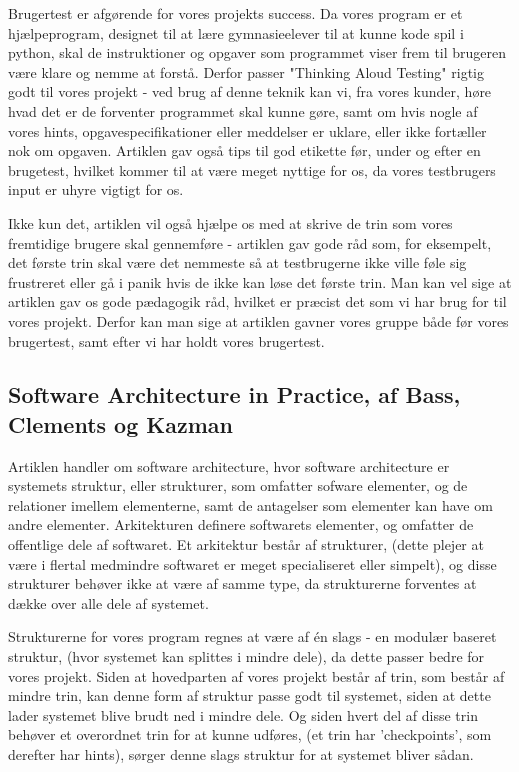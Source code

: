 \documentclass[10pt,a4paper,danish]{article}
\begin{document}
Brugertest er afgørende for vores projekts success. Da vores program er et hjælpeprogram, designet til at lære gymnasieelever til at kunne kode spil i python, skal de instruktioner og opgaver som programmet viser frem til brugeren være klare og nemme at forstå. Derfor passer "Thinking Aloud Testing" rigtig godt til vores projekt - ved brug af denne teknik kan vi, fra vores kunder, høre hvad det er de forventer programmet skal kunne gøre, samt om hvis nogle af vores hints, opgavespecifikationer eller meddelser er uklare, eller ikke fortæller nok om opgaven. Artiklen gav også tips til god etikette før, under og efter en brugetest, hvilket kommer til at være meget nyttige for os, da vores testbrugers input er uhyre vigtigt for os.

Ikke kun det, artiklen vil også hjælpe os med at skrive de trin som vores fremtidige brugere skal gennemføre - artiklen gav gode råd som, for eksempelt, det første trin skal være det nemmeste så at testbrugerne ikke ville føle sig frustreret eller gå i panik hvis de ikke kan løse det første trin. Man kan vel sige at artiklen gav os gode pædagogik råd, hvilket er præcist det som vi har brug for til vores projekt. Derfor kan man sige at artiklen gavner vores gruppe både før vores brugertest, samt efter vi har holdt vores brugertest.

\subsection{Software Architecture in Practice, af Bass, Clements og Kazman}
Artiklen handler om software architecture, hvor software architecture er systemets struktur, eller strukturer, som omfatter sofware elementer, og de relationer imellem elementerne, samt de antagelser som elementer kan have om andre elementer. Arkitekturen definere softwarets elementer, og omfatter de offentlige dele af softwaret. Et arkitektur består af strukturer, (dette plejer at være i flertal medmindre softwaret er meget specialiseret eller simpelt), og disse strukturer behøver ikke at være af samme type, da strukturerne forventes at dække over alle dele af systemet.

Strukturerne for vores program regnes at være af én slags - en modulær baseret struktur, (hvor systemet kan splittes i mindre dele), da dette passer bedre for vores projekt. Siden at hovedparten af vores projekt består af trin, som består af mindre trin, kan denne form af struktur passe godt til systemet, siden at dette lader systemet blive brudt ned i mindre dele. Og siden hvert del af disse trin behøver et overordnet trin for at kunne udføres, (et trin har 'checkpoints', som derefter har hints), sørger denne slags struktur for at systemet bliver sådan.
\end{document}
